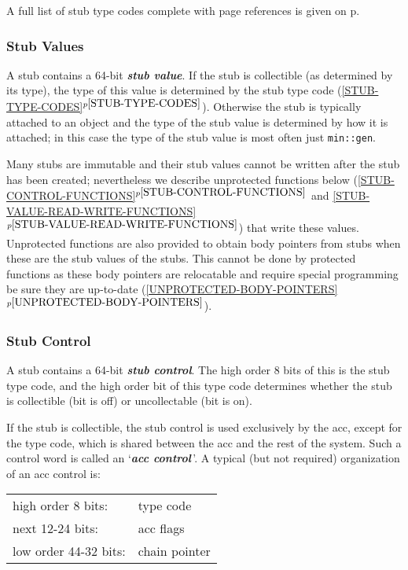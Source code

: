 \documentclass[12pt]{article}
\newcommand{\key}[1]{{\bf \em #1}\index{#1}}
\newcommand{\itemref}[1]{\ref{#1}$^{p\pageref{#1}}$}
\newcommand{\pagref}[1]{p\pageref{#1}}
\begin{document}
A full list of stub type codes complete with page references
is given on \pagref{STUB-TYPE-CODE-LIST}.

\subsubsection{Stub Values}
\label{STUB-VALUES}

A stub contains a 64-bit \key{stub value}.  If the stub is collectible
(as determined by its type), the type of this value
is determined by the stub type code (\itemref{STUB-TYPE-CODES}).
Otherwise the stub is typically attached to an object and the type of the stub
value is determined by how it is attached; in this case the type of the
stub value is most often just \verb|min::gen|.

Many stubs are immutable
and their stub values cannot be written after the stub has been created;
nevertheless we describe unprotected functions
below (\itemref{STUB-CONTROL-FUNCTIONS} and
\itemref{STUB-VALUE-READ-WRITE-FUNCTIONS}) that
write these values.  Unprotected functions are also provided to obtain
body pointers from stubs when these are the stub values of the stubs.
This cannot be done by protected
functions as these body pointers are relocatable and require special
programming be sure they are up-to-date (\itemref{UNPROTECTED-BODY-POINTERS}).

\subsubsection{Stub Control}
\label{STUB-CONTROL}

A stub contains a 64-bit \key{stub control}.  The high order 8 bits
of this is the stub type code, and the high order bit of this type
code determines whether the stub is collectible (bit is off)
or uncollectable (bit is on).

If the stub is collectible,
the stub control is used exclusively by the acc,
except for the type code, which is shared between the acc
and the rest of the system.  Such a control word is called
an `\key{acc control}\,'.  A typical (but not required)
organization of an acc control is:

\begin{center}
\begin{tabular}{ll}
high order 8 bits:	& type code \\
next 12-24 bits:	& acc flags \\
low order 44-32 bits:	& chain pointer \\
\end{tabular}
\end{center}
\end{document}
